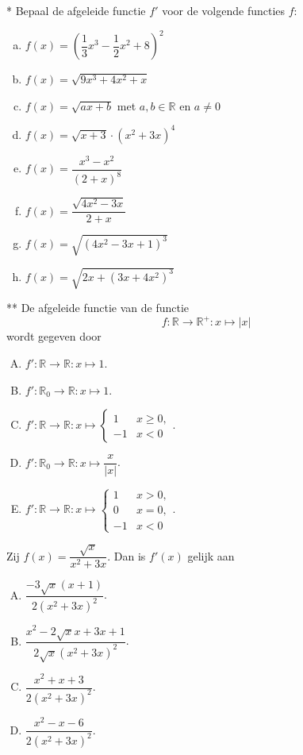 \documentclass[12pt]{article}
\begin{document}
\begin{oefening}*
  Bepaal de afgeleide functie $f'$ voor de volgende functies $f$:
  \begin{multicols}{2}
  \begin{enumerate}[(a)]
  \itemsep1em
  \item $\displaystyle f(x)=(\dfrac{1}{3}x^3-\dfrac{1}{2}x^2+8)^2$
  \item $\displaystyle f(x)=\sqrt{9x^3+4x^2+x}$
  \item $\displaystyle f(x)=\sqrt{ax+b}$ met $a,b\in\mathbb{R}$ en $a\neq 0$
  \item $\displaystyle f(x)=\sqrt{x+3}\cdot(x^2+3x)^4$
  \item $\displaystyle f(x)=\dfrac{x^3-x^2}{(2+x)^8}$
  \item $\displaystyle f(x)=\dfrac{\sqrt{4x^2-3x}}{2+x}$
  \item $\displaystyle f(x)=\sqrt{(4x^2-3x+1)^3}$
  \item $\displaystyle f(x)=\sqrt{2x+(3x+4x^2)^3}$
  \end{enumerate}
  \end{multicols}
\end{oefening}

\begin{oefening}** %
De afgeleide functie van de functie
$$f:\mathbb{R}\to\mathbb{R^+}:x\mapsto |x|$$
wordt gegeven door
\begin{enumerate}[(A)]
  \item $f':\mathbb{R}\to\mathbb{R}:x\mapsto 1$.
  \item $f':\mathbb{R}_0\to\mathbb{R}:x\mapsto 1$.
  \item $f':\mathbb{R}\to\mathbb{R}:x\mapsto \begin{cases}1  & x\geq0,\\-1 & x<0\end{cases}$.
  \item $f':\mathbb{R}_0\to\mathbb{R}:x\mapsto \dfrac{x}{|x|}$.
  \item $f':\mathbb{R}\to\mathbb{R}:x\mapsto \begin{cases}1  & x>0,\\0  & x=0,\\-1 & x<0\end{cases}$.
\end{enumerate}
\end{oefening}

\begin{oefening} %
Zij $\displaystyle f(x)=\dfrac{\sqrt{x}}{x^2+3x}$. Dan is $f'(x)$ gelijk aan
\begin{enumerate}[(A)]
  \itemsep1em
  \item $\displaystyle \dfrac{-3\sqrt{x}(x+1)}{2(x^2+3x)^2}$.
  \item $\displaystyle \dfrac{x^2-2\sqrt{x}x+3x+1}{2\sqrt{x}(x^2+3x)^2}$.
  \item $\displaystyle \dfrac{x^2+x+3}{2(x^2+3x)^2}$.
  \item $\displaystyle \dfrac{x^2-x-6}{2(x^2+3x)^2}$.
\end{enumerate}
\end{oefening}
\end{document}
